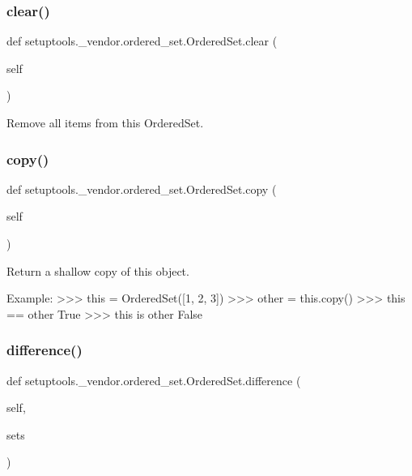 \subsubsection{\texorpdfstring{clear()}{clear()}}
{\footnotesize\ttfamily def setuptools.\+\_\+vendor.\+ordered\+\_\+set.\+Ordered\+Set.\+clear (\begin{DoxyParamCaption}\item[{}]{self }\end{DoxyParamCaption})}

\begin{DoxyVerb}Remove all items from this OrderedSet.
\end{DoxyVerb}
 \mbox{\label{classsetuptools_1_1__vendor_1_1ordered__set_1_1OrderedSet_a84224c403039b9dac5d2794d85073053}} 
\subsubsection{\texorpdfstring{copy()}{copy()}}
{\footnotesize\ttfamily def setuptools.\+\_\+vendor.\+ordered\+\_\+set.\+Ordered\+Set.\+copy (\begin{DoxyParamCaption}\item[{}]{self }\end{DoxyParamCaption})}

\begin{DoxyVerb}Return a shallow copy of this object.

Example:
    >>> this = OrderedSet([1, 2, 3])
    >>> other = this.copy()
    >>> this == other
    True
    >>> this is other
    False
\end{DoxyVerb}
 \mbox{\label{classsetuptools_1_1__vendor_1_1ordered__set_1_1OrderedSet_a02281d7fc2351104ab20d53aa827fa38}} 
\subsubsection{\texorpdfstring{difference()}{difference()}}
{\footnotesize\ttfamily def setuptools.\+\_\+vendor.\+ordered\+\_\+set.\+Ordered\+Set.\+difference (\begin{DoxyParamCaption}\item[{}]{self,  }\item[{}]{sets }\end{DoxyParamCaption})}

